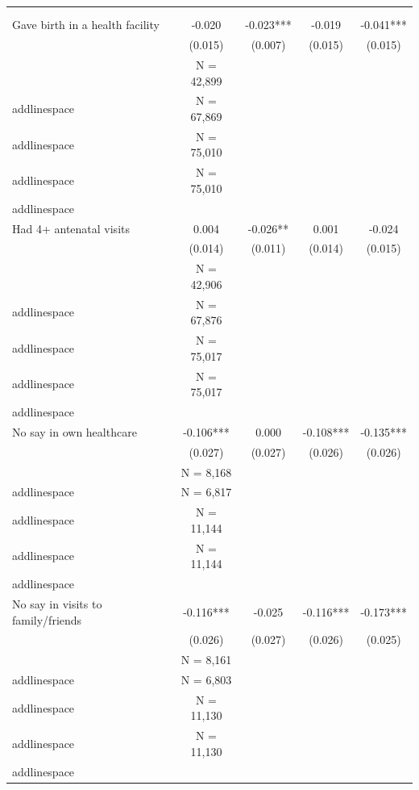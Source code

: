 \begin{tabular}{lcccc}
\toprule
 &  &  &  &  \\\\
\midrule
Gave birth in a health facility&-0.020&-0.023***&-0.019&-0.041***\\
&(0.015)&(0.007)&(0.015)&(0.015)\\
&N = 42,899 \\addlinespace&N = 67,869 \\addlinespace&N = 75,010 \\addlinespace&N = 75,010 \\addlinespace\\
Had 4+ antenatal visits&0.004&-0.026**&0.001&-0.024\\
&(0.014)&(0.011)&(0.014)&(0.015)\\
&N = 42,906 \\addlinespace&N = 67,876 \\addlinespace&N = 75,017 \\addlinespace&N = 75,017 \\addlinespace\\
No say in own healthcare&-0.106***&0.000&-0.108***&-0.135***\\
&(0.027)&(0.027)&(0.026)&(0.026)\\
&N = 8,168 \\addlinespace&N = 6,817 \\addlinespace&N = 11,144 \\addlinespace&N = 11,144 \\addlinespace\\
No say in visits to family/friends&-0.116***&-0.025&-0.116***&-0.173***\\
&(0.026)&(0.027)&(0.026)&(0.025)\\
&N = 8,161 \\addlinespace&N = 6,803 \\addlinespace&N = 11,130 \\addlinespace&N = 11,130 \\addlinespace\\
\bottomrule
\end{tabular}
